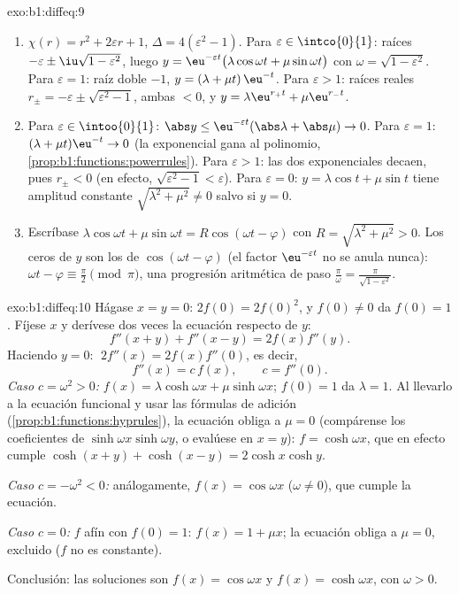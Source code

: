 \begin{solution}{exo:b1:diffeq:9}
\begin{enumerate}
  \item $\chi(r) = r^2 + 2\varepsilon r + 1$, $\Delta = 4(\varepsilon^2
        - 1)$.
        Para $\varepsilon \in \intco{0}{1}$: raíces $-\varepsilon \pm
        \iu\sqrt{1 - \varepsilon^2}$, luego
        $y = \eu^{-\varepsilon t}\bigl(\lambda\cos\omega t +
        \mu\sin\omega t\bigr)$ con $\omega = \sqrt{1 -
        \varepsilon^2}$.
        Para $\varepsilon = 1$: raíz doble $-1$, $y = (\lambda + \mu
        t)\,\eu^{-t}$.
        Para $\varepsilon > 1$: raíces reales $r_\pm = -\varepsilon \pm
        \sqrt{\varepsilon^2 - 1}$, ambas $< 0$, y $y =
        \lambda\eu^{r_+t} + \mu\eu^{r_-t}$.
  \item Para $\varepsilon \in \intoo{0}{1}$: $\abs y \leq
        \eu^{-\varepsilon t}(\abs\lambda + \abs\mu) \to 0$. Para
        $\varepsilon = 1$: $(\lambda + \mu t)\eu^{-t} \to 0$ (la
        exponencial gana al polinomio,
        \cref{prop:b1:functions:powerrules}). Para $\varepsilon > 1$:
        las dos exponenciales decaen, pues $r_\pm < 0$ (en efecto,
        $\sqrt{\varepsilon^2 - 1} < \varepsilon$). Para
        $\varepsilon = 0$: $y = \lambda\cos t + \mu\sin t$ tiene
        amplitud constante $\sqrt{\lambda^2 + \mu^2} \neq 0$ salvo si
        $y = 0$.
  \item Escríbase $\lambda\cos\omega t + \mu\sin\omega t =
        R\cos(\omega t - \varphi)$ con $R = \sqrt{\lambda^2 + \mu^2}
        > 0$. Los ceros de $y$ son los de $\cos(\omega t -
        \varphi)$ (el factor $\eu^{-\varepsilon t}$ no se anula
        nunca): $\omega t - \varphi \equiv \frac\pi2 \pmod \pi$, una
        progresión aritmética de paso $\frac{\pi}{\omega} =
        \frac{\pi}{\sqrt{1 - \varepsilon^2}}$.
\end{enumerate}
\end{solution}

\begin{solution}{exo:b1:diffeq:10}
Hágase $x = y = 0$: $2f(0) = 2f(0)^2$, y $f(0) \neq 0$ da $f(0) = 1$.
Fíjese $x$ y derívese dos veces la ecuación respecto de $y$:
\[
f''(x+y) + f''(x-y) = 2 f(x) f''(y) .
\]
Haciendo $y = 0$: $\;2f''(x) = 2 f(x) f''(0)$, es decir,
\[
f''(x) = c\,f(x), \qquad c = f''(0).
\]
\emph{Caso $c = \omega^2 > 0$:} $f(x) = \lambda\cosh\omega x +
\mu\sinh\omega x$; $f(0) = 1$ da $\lambda = 1$. Al llevarlo a la
ecuación funcional y usar las fórmulas de adición
(\cref{prop:b1:functions:hyprules}), la ecuación obliga a $\mu = 0$
(compárense los coeficientes de $\sinh\omega x \sinh\omega y$, o
evalúese en $x = y$): $f = \cosh\omega x$, que en efecto cumple
$\cosh(x+y) + \cosh(x-y) = 2\cosh x\cosh y$.

\emph{Caso $c = -\omega^2 < 0$:} análogamente, $f(x) = \cos\omega x$
($\omega \neq 0$), que cumple la ecuación.

\emph{Caso $c = 0$:} $f$ afín con $f(0) = 1$: $f(x) = 1 + \mu x$; la
ecuación obliga a $\mu = 0$, excluido ($f$ no es constante).

Conclusión: las soluciones son $f(x) = \cos\omega x$ y
$f(x) = \cosh\omega x$, con $\omega > 0$.
\end{solution}

